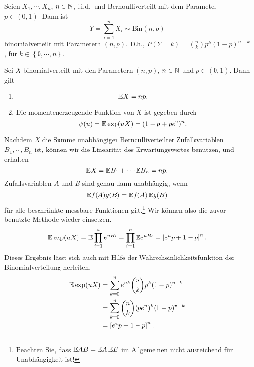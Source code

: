 Seien $X_1, \cdots, X_n$, $n\in\mathbb N$, i.i.d.\ und Bernoulliverteilt mit dem Parameter $p\in (0,1)$. 
Dann ist
\begin{equation*}
    Y=\sum_{i=1}^{n} X_i \sim \text{Bin}(n,p)
\end{equation*}
binomialverteilt mit Parametern $(n,p)$. D.h., $P(Y = k) = \binom{n}{k}  p^{k}(1-p)^{n-k}$, 
für $k\in \left\{ 0, \cdots, n \right\}$.

Sei $X$ binomialverteilt mit den Parametern $(n,p)$, $n\in\mathbb{N}$ und $p\in(0,1)$. Dann gilt
\begin{enumerate}
    \item \begin{equation*}
            \mathbb{E} X = np. 
        \end{equation*}
    \item Die momentenerzeugende Funktion von $X$ ist gegeben durch
        \begin{equation*}
            \psi(u) = \mathbb{E} \exp( uX) = (1 -p + p e^u)^{n}.
        \end{equation*}
\end{enumerate}
\solution
Nachdem $X$ die Summe unabhängiger Bernoulliverteilter Zufallsvariablen $B_1,
\cdots, B_n$ ist, können wir die Linearität des Erwartungswertes benutzen, und
erhalten
\begin{equation*}
    \mathbb{E} X = \mathbb{E} B_1 + \cdots \mathbb{E} B_n = np. 
\end{equation*}
Zufallsvariablen $A$ und $B$ sind genau dann unabhängig, wenn 
\begin{equation*}
    \mathbb{E} f(A)g(B) = \mathbb{E} f(A)\, \mathbb{E} g(B)
\end{equation*}
für alle beschränkte messbare Funktionen gilt.\footnote{Beachten Sie, dass $\mathbb{E}
AB = \mathbb{E} A\, \mathbb{E} B$ im Allgemeinen nicht ausreichend für Unabhängigkeit ist!}
Wir können also die zuvor benutzte Methode wieder einsetzen. 
\begin{equation*}
    \mathbb{E} \exp (u X) = \mathbb{E} \prod_{i=1}^{n} e^{u B_i} 
    = \prod_{i=1}^{n} \mathbb{E} e^{u B_i} 
    = \left[ e^{u}p + 1 -p \right]^{n}.
\end{equation*}
Dieses Ergebnis lässt sich auch mit Hilfe der Wahrscheinlichkeitsfunktion der 
Binomialverteilung herleiten. 
\begin{align*}
    \mathbb{E} \exp (u X) &= \sum_{k=0}^{n} e^{u k} \binom{n}{k} p^{k}(1-p)^{n-k} \\
    &= \sum_{k=0}^{n} \binom{n}{k} (p e^{u})^{k}(1-p)^{n-k} \\
    &= \left[ e^u p + 1-p \right]^n.
\end{align*}

